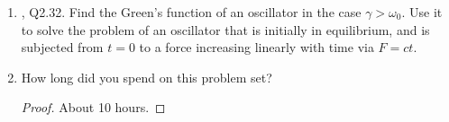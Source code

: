 \documentclass[../psets.tex]{subfiles}
\begin{document}
\begin{enumerate}
\begin{enumerate}
\begin{proof}
\begin{align*}
            \end{align*}
            This simplifies the above expression to
            \begin{equation*}
                \bar{P} = \frac{a_1\omega_1F_1\sin\theta_1}{2}
            \end{equation*}
            But we're not quite done. Recalling that
            \begin{align*}
                \tan\theta_1 &= \frac{2\gamma\omega_1}{\omega_0^2-\omega_1^2}&
                \sin(\tan^{-1}(x)) &= \frac{x}{\sqrt{x^2+1}}
            \end{align*}
            we can learn that
            \begin{equation*}
                \sin\theta_1 = \frac{\frac{2\gamma\omega_1}{\omega_0^2-\omega_1^2}}{\sqrt{\left( \frac{2\gamma\omega_1}{\omega_0^2-\omega_1^2} \right)^2+1}}
                = \frac{2ma_1\omega_1}{F_1\gamma}
            \end{equation*}
            Therefore, we have that
            \begin{align*}
                \bar{P} &= \frac{a_1\omega_1F_1\sin\theta_1}{2}\\
                &= \frac{a_1\omega_1F_1}{2}\cdot\frac{2ma_1\omega_1}{F_1\gamma}\\
                \bar{P} &= \frac{ma_1^2\omega_1^2}{\gamma}
            \end{align*}
            as desired.
        \end{proof}
        \item Show that the power $P$ --- as a function of $\omega_1$ --- is at a maximum at $\omega_1=\omega_0$. Also find the values of $\omega_1$ for which it has half its maximum value. (3 pts)
    \end{enumerate}
    \item \textcite{bib:KibbleBerkshire}, Q2.32. Find the Green's function of an oscillator in the case $\gamma>\omega_0$. Use it to solve the problem of an oscillator that is initially in equilibrium, and is subjected from $t=0$ to a force increasing linearly with time via $F=ct$.
        
    \item How long did you spend on this problem set?
    \begin{proof}
        About 10 hours.
    \end{proof}
\end{enumerate}
\end{document}
